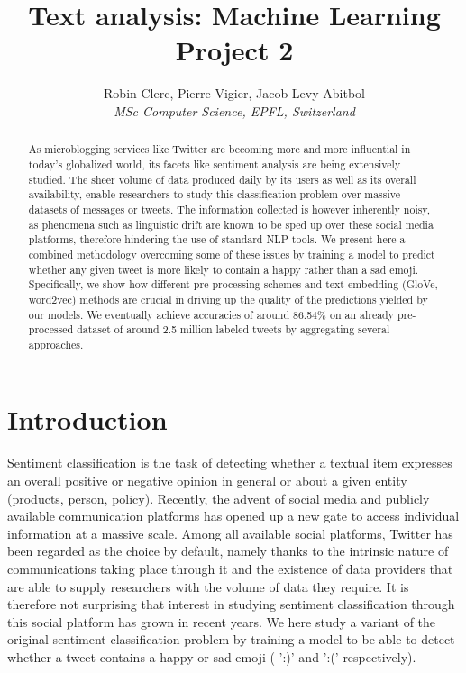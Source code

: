 \documentclass[10pt,conference,compsocconf,retainorgcmds]{IEEEtran}
\begin{document}
\title{Text analysis: Machine Learning Project 2}

\author{
  Robin Clerc, Pierre Vigier, Jacob Levy Abitbol\\
  \textit{MSc  Computer Science, EPFL, Switzerland}
}

\maketitle

\begin{abstract}
As microblogging services like Twitter are becoming
more and more influential in today’s globalized world, its facets
like sentiment analysis are being extensively studied. The sheer volume of data produced daily by its users as well as its overall availability, enable researchers to study this classification problem over massive datasets of messages or tweets. The information collected is however inherently noisy, as phenomena such as linguistic drift are known to be sped up over these social media platforms, therefore hindering the use of standard NLP tools. We present here a combined methodology overcoming some of these issues by training a model to predict whether any given tweet is more likely to contain a happy rather than a sad emoji. Specifically, we show how different pre-processing schemes and text embedding (GloVe, word2vec) methods are crucial in driving up the quality of the  predictions yielded by our models. We eventually achieve accuracies of around 86.54\% on an already pre-processed dataset of around 2.5 million labeled tweets by aggregating several approaches.
\end{abstract}








\section{Introduction}
Sentiment classification is the task of detecting whether a textual item expresses an overall positive or negative opinion in general or about a given entity (products, person, policy).
Recently, the advent of social media and publicly available communication platforms has opened up a new gate to access individual information at a massive scale. Among all available social platforms, Twitter has been regarded as the choice by default, namely thanks to the intrinsic nature of communications taking place through it and the existence of data providers that are able to supply researchers with the volume of data they require. It is therefore not surprising that interest in studying sentiment classification through this social platform has grown in recent years. We here study a variant of the original sentiment classification problem by training a model to be able to detect whether a tweet contains  a  happy or sad emoji ( ':)' and  ':('   respectively).
\end{document}
